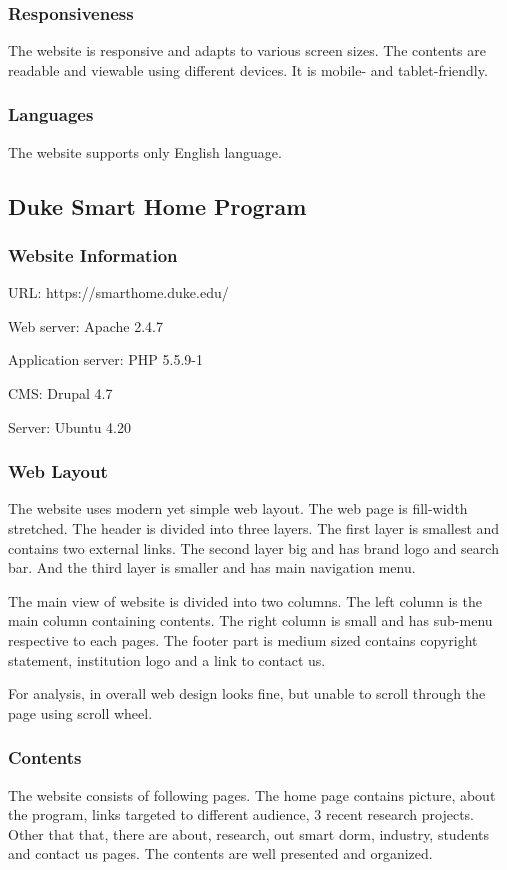 \subsubsection*{Responsiveness}
The website is responsive and adapts to various screen sizes. The contents are readable and viewable using different devices. It is mobile- and tablet-friendly.

\subsubsection*{Languages}
The website supports only English language.

\subsection{Duke Smart Home Program}
\subsubsection*{Website Information}
\begin{itemize*}
\item URL: https://smarthome.duke.edu/
\item Web server: Apache 2.4.7
\item Application server: PHP 5.5.9-1
\item CMS: Drupal 4.7
\item Server: Ubuntu 4.20
\end{itemize*}

\subsubsection*{Web Layout}
The website uses modern yet simple web layout. The web page is fill-width stretched. The header is divided into three layers. The first layer is smallest and contains two external links. The second layer big and has brand logo and search bar. And the third layer is smaller and has main navigation menu.

The main view of website is divided into two columns. The left column is the main column containing contents. The right column is small and has sub-menu respective to each pages. The footer part is medium sized contains copyright statement, institution logo and a link to contact us.

For analysis, in overall web design looks fine, but unable to scroll through the page using scroll wheel.

\subsubsection*{Contents}
The website consists of following pages. The home page contains picture, about the program, links targeted to different audience, 3 recent research projects. Other that that, there are about, research, out smart dorm, industry, students and contact us pages. The contents are well presented and organized.


